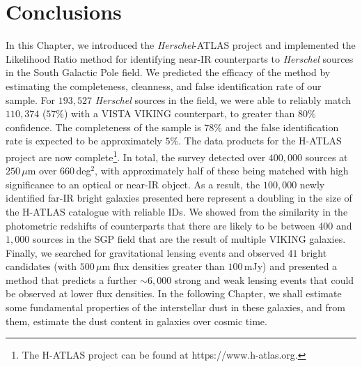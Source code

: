 \section{Conclusions}

In this Chapter, we introduced the \textit{Herschel}-ATLAS project and implemented the Likelihood Ratio method for identifying near-IR counterparts to \textit{Herschel} sources in the South Galactic Pole field. We predicted the efficacy of the method by estimating the completeness, cleanness, and false identification rate of our sample. For $193,527$ \textit{Herschel} sources in the field, we were able to reliably match $110,374$ ($57\%$) with a VISTA VIKING counterpart, to greater than $80\%$ confidence. The completeness of the sample is $78\%$ and the false identification rate is expected to be approximately $5\%$. The data products for the H-ATLAS project are now complete\footnote{The H-ATLAS project can be found at https://www.h-atlas.org.}. In total, the survey detected over $400,000$ sources at $250\,\mu$m over $660\,$deg$^2$, with approximately half of these being matched with high significance to an optical or near-IR object. As a result, the $100,000$ newly identified far-IR bright galaxies presented here represent a doubling in the size of the H-ATLAS catalogue with reliable IDs. We showed from the similarity in the photometric redshifts of counterparts that there are likely to be between $400$ and $1,000$ sources in the SGP field that are the result of multiple VIKING galaxies. Finally, we searched for gravitational lensing events and observed $41$ bright candidates (with $500\,\mu$m flux densities greater than $100\,$mJy) and presented a method that predicts a further $\sim 6,000$ strong and weak lensing events that could be observed at lower flux densities. In the following Chapter, we shall estimate some fundamental properties of the interstellar dust in these galaxies, and from them, estimate the dust content in galaxies over cosmic time.
